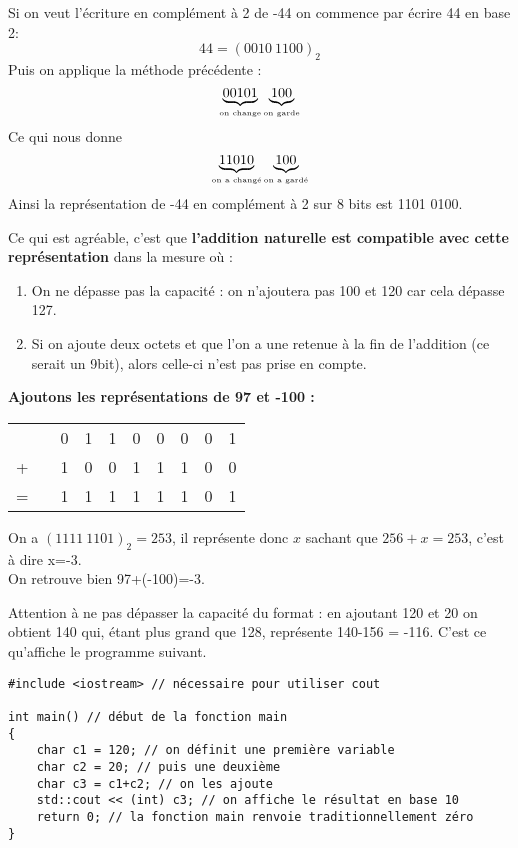 \documentclass[a4paper,12pt,french]{book}
\begin{document}
\begin{exemple}
Si on veut l'écriture en complément à 2 de -44 on commence par écrire 44 en base 2:
$$44=(0010\ 1100)_2$$
Puis on applique la méthode précédente :
$$\underbrace{00101}_{\textrm{\tiny on change}}\underbrace{100}_{\textrm{\tiny on garde}}$$
Ce qui nous donne $$\underbrace{11010}_{\textrm{\tiny on a changé}}\underbrace{100}_{\textrm{\tiny on a gardé}}$$
Ainsi la représentation de -44 en complément à 2 sur 8 bits est 1101 0100.

\end{exemple}
Ce qui est agréable, c'est que \textbf{l'addition naturelle est compatible avec cette représentation} dans la mesure où
:
\begin{enumerate}[\textbullet]
\item 	On ne dépasse pas la capacité : on n'ajoutera pas 100 et 120 car cela dépasse 127.
\item 	Si on ajoute deux octets et que l'on a une retenue à la fin de l'addition (ce serait un 9\eme bit), alors
celle-ci n'est pas prise en compte.
\end{enumerate}

\begin{exemple}
\textbf{Ajoutons les représentations de 97 et -100 :}
\begin{center}

\begin{tabular}{cccccccccc}
  &  & 0 & 1 & 1 & 0 & 0 & 0 & 0 & 1 \\

+ &  & 1 & 0 & 0 & 1 & 1 & 1 & 0 & 0 \\
\hline
= &  & 1 & 1 & 1 & 1 & 1 & 1 & 0 & 1 \\
\end{tabular}
\end{center}

On a $(1111\ 1101)_2=253$, il représente donc $x$ sachant que $256+x=253$, c'est à dire x=-3.\\

On retrouve bien 97+(-100)=-3.
\end{exemple}

Attention à ne pas dépasser la capacité du format : en ajoutant 120 et 20 on obtient 140 qui, étant plus grand que 128, représente 140-156 = -116. C'est ce qu'affiche le programme suivant.
\begin{verbatim}
#include <iostream> // nécessaire pour utiliser cout

int main() // début de la fonction main
{
    char c1 = 120; // on définit une première variable
    char c2 = 20; // puis une deuxième
    char c3 = c1+c2; // on les ajoute
    std::cout << (int) c3; // on affiche le résultat en base 10
    return 0; // la fonction main renvoie traditionnellement zéro
}
\end{verbatim}
\end{document}
